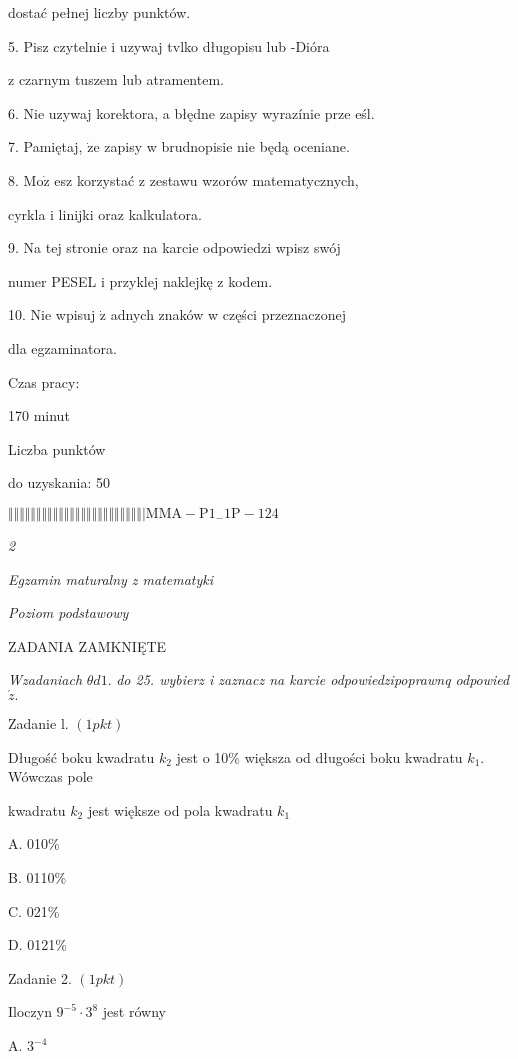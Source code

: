 \documentclass[a4paper,12pt]{article}
\begin{document}
dostać pełnej liczby punktów.

5. Pisz czytelnie i uzywaj tvlko długopisu lub -Dióra

z czarnym tuszem lub atramentem.

6. Nie uzywaj korektora, a błędne zapisy wyrazínie prze eśl.

7. Pamiętaj, $\dot{\mathrm{z}}\mathrm{e}$ zapisy w brudnopisie nie będą oceniane.

8. $\mathrm{M}\mathrm{o}\dot{\mathrm{z}}$ esz korzystać z zestawu wzorów matematycznych,

cyrkla i linijki oraz kalkulatora.

9. Na tej stronie oraz na karcie odpowiedzi wpisz swój

numer PESEL i przyklej naklejkę z kodem.

10. Nie wpisuj $\dot{\mathrm{z}}$ adnych znaków w części przeznaczonej

dla egzaminatora.

Czas pracy:

170 minut

Liczba punktów

do uzyskania: 50

$\Vert\Vert\Vert\Vert\Vert\Vert\Vert\Vert\Vert\Vert\Vert\Vert\Vert\Vert\Vert\Vert\Vert\Vert\Vert\Vert\Vert\Vert\Vert\Vert|  \mathrm{M}\mathrm{M}\mathrm{A}-\mathrm{P}1_{-}1\mathrm{P}-124$




{\it 2}

{\it Egzamin maturalny z matematyki}

{\it Poziom podstawowy}

ZADANIA ZAMKNIĘTE

{\it Wzadaniach} $\theta d1.$ {\it do 25. wybierz i zaznacz na karcie odpowiedzipoprawnq odpowied} $\acute{z}.$

Zadanie l. $(1pkt)$

Długość boku kwadratu $k_{2}$ jest o 10\% większa od długości boku kwadratu $k_{1}$. Wówczas pole

kwadratu $k_{2}$ jest większe od pola kwadratu $k_{1}$

A. 010\%

B. 0110\%

C. 021\%

D. 0121\%

Zadanie 2. $(1pkt)$

Iloczyn $9^{-5}\cdot 3^{8}$ jest równy

A. $3^{-4}$
\end{document}
